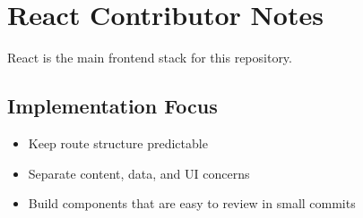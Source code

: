 \section{React Contributor Notes}

React is the main frontend stack for this repository.

\subsection{Implementation Focus}
\begin{itemize}
  \item Keep route structure predictable
  \item Separate content, data, and UI concerns
  \item Build components that are easy to review in small commits
\end{itemize}
